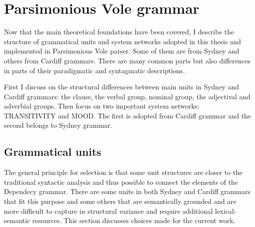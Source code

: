 \chapter{Parsimonious Vole grammar}
\label{ch:the-grammar}

Now that the main theoretical foundations have been covered, I describe the structure of grammatical units and system networks adopted in this thesis and implemented in Parsimonious Vole parser. Some of them are from Sydney and others from Cardiff grammars. There are many common parts but also differences in parts of their paradigmatic and syntagmatic descriptions. %

First I discuss on the structural differences between main units in Sydney and Cardiff grammars: the clause, the verbal group, nominal group, the adjectival and adverbial groups. Then focus on two important system networks: TRANSITIVITY  and MOOD. The first is adopted from Cardiff grammar and the second belongs to Sydney grammar.

\section{Grammatical units}
\label{sec:discussion-unit-classes}

The general principle for selection is that some unit structures are closer to the traditional syntactic analysis and thus possible to connect the elements of the Dependecy grammar. There are some units in both Sydney and Cardiff grammars that fit this purpose and some others that are semantically grounded and are more difficult to capture in structural variance and require additional lexical-semantic resources. This section discusses choices made for the current work. 


